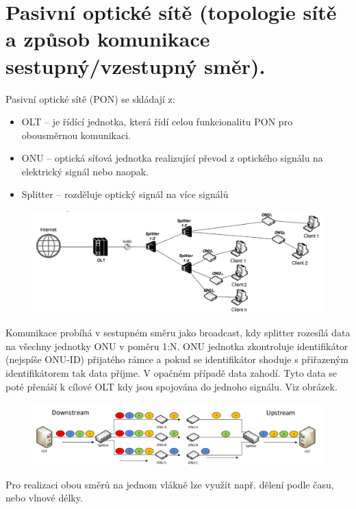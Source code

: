 \clearpage
\section{Pasivní optické sítě (topologie sítě a způsob komunikace sestupný/vzestupný směr).}
Pasivní optické sítě (PON) se skládají z:
\begin{itemize}
    \item OLT -- je řídící jednotka, která řídí celou funkcionalitu PON pro obousměrnou komunikaci.
    \item ONU -- optická síťová jednotka realizující převod z optického signálu na elektrický signál nebo naopak.
    \item Splitter -- rozděluje optický signál na více signálů
\end{itemize}
\begin{figure} [h]
    \centering
    \includegraphics[width=\textwidth]{snimky/PONTopologie.png}
    \label{fig:pon}
\end{figure}

Komunikace probíhá v sestupném směru jako broadcast, kdy splitter rozesílá data na všechny jednotky ONU v poměru 1:N. ONU jednotka zkontroluje identifikátor (nejspíše ONU-ID) přijatého rámce a pokud se identifikátor shoduje s přiřazeným identifikátorem tak data příjme. V opačném případě data zahodí. Tyto data se poté přenáší k cílové OLT kdy jsou spojována do jednoho signálu. Viz obrázek.

\begin{figure} [h]
    \centering
    \includegraphics[width=\textwidth]{snimky/upDownPON.png}
\end{figure}

Pro realizaci obou směrů na jednom vlákně lze využít např. dělení podle času, nebo vlnové délky.
\clearpage
